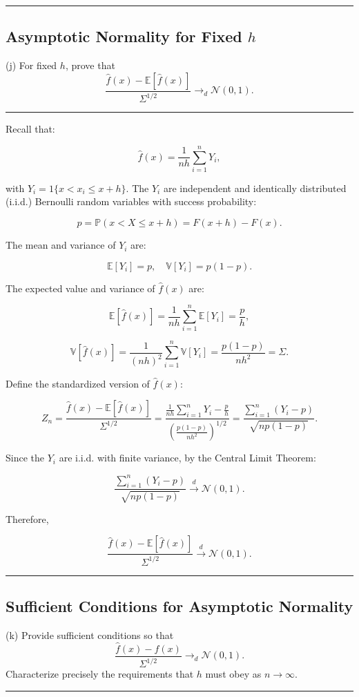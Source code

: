 \documentclass{article}
\newenvironment{colorparagraph}[1]{\par\color{#1}}{\par}
\begin{document}
\begin{colorparagraph}{questioncolor}
\label{q2j}
\rule{\textwidth}{0.5pt}
\subsection{Asymptotic Normality for Fixed \( h \)}
(j) For fixed \( h \), prove that
\[
\frac{\hat{f}(x) - \mathbb{E}[\hat{f}(x)]}{\Sigma^{1/2}} \to_d \mathcal{N}(0, 1).
\]

\rule{\textwidth}{0.5pt}
\end{colorparagraph}

Recall that:

\[
\hat{f}(x) = \frac{1}{n h} \sum_{i=1}^n Y_i,
\]

with \( Y_i = 1\{ x < x_i \leq x + h \} \). The \( Y_i \) are independent and identically distributed (i.i.d.) Bernoulli random variables with success probability:

\[
p = \mathbb{P}(x < X \leq x + h) = F(x + h) - F(x).
\]

The mean and variance of \( Y_i \) are:

\[
\mathbb{E}[Y_i] = p, \quad \mathbb{V}[Y_i] = p (1 - p).
\]

The expected value and variance of \( \hat{f}(x) \) are:

\[
\mathbb{E}[\hat{f}(x)] = \frac{1}{n h} \sum_{i=1}^n \mathbb{E}[Y_i] = \frac{p}{h},
\]

\[
\mathbb{V}[\hat{f}(x)] = \frac{1}{(n h)^2} \sum_{i=1}^n \mathbb{V}[Y_i] = \frac{p (1 - p)}{n h^2} = \Sigma.
\]

Define the standardized version of \( \hat{f}(x) \):

\[
Z_n = \frac{\hat{f}(x) - \mathbb{E}[\hat{f}(x)]}{\Sigma^{1/2}} = \frac{\frac{1}{n h} \sum_{i=1}^n Y_i - \frac{p}{h}}{\left( \frac{p (1 - p)}{n h^2} \right)^{1/2}} = \frac{\sum_{i=1}^n (Y_i - p)}{\sqrt{n p (1 - p)}}.
\]

Since the \( Y_i \) are i.i.d. with finite variance, by the Central Limit Theorem:

\[
\frac{\sum_{i=1}^n (Y_i - p)}{\sqrt{n p (1 - p)}} \xrightarrow{d} \mathcal{N}(0, 1).
\]

Therefore,

\[
\frac{\hat{f}(x) - \mathbb{E}[\hat{f}(x)]}{\Sigma^{1/2}} \xrightarrow{d} \mathcal{N}(0, 1).
\]

\begin{colorparagraph}{questioncolor}
\label{q2k}
\rule{\textwidth}{0.5pt}
\subsection{Sufficient Conditions for Asymptotic Normality}
(k) Provide sufficient conditions so that
\[
\frac{\hat{f}(x) - f(x)}{\Sigma^{1/2}} \to_d \mathcal{N}(0, 1).
\]
Characterize precisely the requirements that \( h \) must obey as \( n \to \infty \).

\rule{\textwidth}{0.5pt}
\end{colorparagraph}
\end{document}
